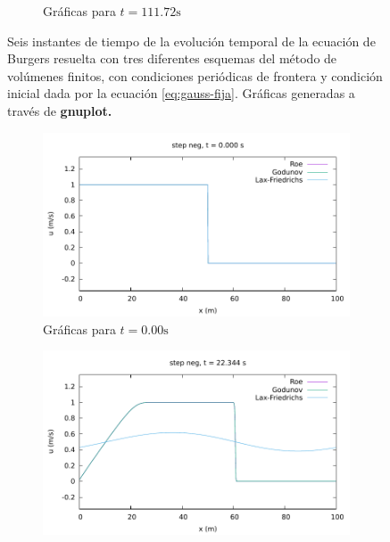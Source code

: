 \documentclass[12pt]{article}
\begin{document}
\begin{figure}[h!]
\begin{subfigure}{0.4\textwidth}
			\caption*{Gráficas para $t=111.72\unit{\second}$}
			\label{fig:gauss-perio6}
		\end{subfigure}
		\caption{Seis instantes de tiempo de la evolución temporal de  la ecuación de Burgers resuelta con tres diferentes esquemas del método de volúmenes finitos, con condiciones periódicas de frontera y condición inicial dada por la ecuación \ref{eq:gauss-fija}. Gráficas generadas a través de \textbf{gnuplot.}}
		\label{fig:gauss-periodica}
	\end{figure}

	\begin{figure}[h!]
		\centering
		\begin{subfigure}{0.49\textwidth}
			\centering
			\includegraphics[width=\textwidth]{../burgers1DVF/results/sol_periodicas/step_neg/000.pdf}
			\caption*{Gráficas para $t=0.00\unit{\second}$}
			\label{fig:step_neg-perio1}
		\end{subfigure}\hfill
		\begin{subfigure}{0.49\textwidth}
			\centering
			\includegraphics[width=\textwidth]{../burgers1DVF/results/sol_periodicas/step_neg/021.pdf}

\end{subfigure}
\end{figure}
\end{document}
